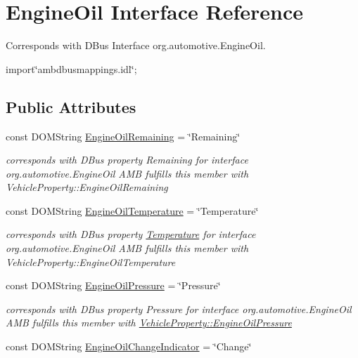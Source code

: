 \hypertarget{interfaceEngineOil}{\section{Engine\+Oil Interface Reference}
\label{interfaceEngineOil}
}


Corresponds with D\+Bus Interface org.\+automotive.\+Engine\+Oil.  




{\ttfamily import\char`\"{}ambdbusmappings.\+idl\char`\"{};}

\subsection*{Public Attributes}
\begin{DoxyCompactItemize}
\item 
const D\+O\+M\+String \hyperlink{interfaceEngineOil_a28a148b5fcbf4d61ab438f229870e997}{Engine\+Oil\+Remaining} = \char`\"{}Remaining\char`\"{}
\begin{DoxyCompactList}\small\item\em corresponds with D\+Bus property Remaining for interface org.\+automotive.\+Engine\+Oil A\+M\+B fulfills this member with Vehicle\+Property\+::\+Engine\+Oil\+Remaining \end{DoxyCompactList}\item 
\hypertarget{interfaceEngineOil_a5b260a98314b5f69eae0411db6318a3f}{const D\+O\+M\+String \hyperlink{interfaceEngineOil_a5b260a98314b5f69eae0411db6318a3f}{Engine\+Oil\+Temperature} = \char`\"{}Temperature\char`\"{}}\label{interfaceEngineOil_a5b260a98314b5f69eae0411db6318a3f}

\begin{DoxyCompactList}\small\item\em corresponds with D\+Bus property \hyperlink{interfaceTemperature}{Temperature} for interface org.\+automotive.\+Engine\+Oil A\+M\+B fulfills this member with Vehicle\+Property\+::\+Engine\+Oil\+Temperature \end{DoxyCompactList}\item 
\hypertarget{interfaceEngineOil_a380dd755fe98983b8128bac94b64b9b5}{const D\+O\+M\+String \hyperlink{interfaceEngineOil_a380dd755fe98983b8128bac94b64b9b5}{Engine\+Oil\+Pressure} = \char`\"{}Pressure\char`\"{}}\label{interfaceEngineOil_a380dd755fe98983b8128bac94b64b9b5}

\begin{DoxyCompactList}\small\item\em corresponds with D\+Bus property Pressure for interface org.\+automotive.\+Engine\+Oil A\+M\+B fulfills this member with \hyperlink{classVehicleProperty_ab7fad273c7149dbd338f53f2536aca26}{Vehicle\+Property\+::\+Engine\+Oil\+Pressure} \end{DoxyCompactList}\item 
\hypertarget{interfaceEngineOil_a03d33d32192b81088d1ed52d2f959262}{const D\+O\+M\+String \hyperlink{interfaceEngineOil_a03d33d32192b81088d1ed52d2f959262}{Engine\+Oil\+Change\+Indicator} = \char`\"{}Change\char`\"{}}\label{interfaceEngineOil_a03d33d32192b81088d1ed52d2f959262}


\end{DoxyCompactItemize}
